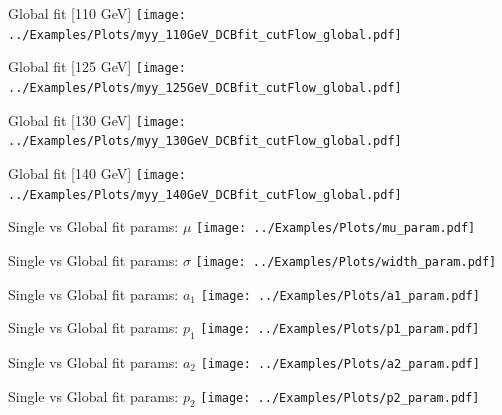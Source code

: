\documentclass[10pt,UKenglish, leqno, xcolor = dvipsnames]{beamer}
\begin{document}
		\begin{frame}{Global fit [110 GeV]}
			\vfill
			\texttt{[image: ../Examples/Plots/myy\_110GeV\_DCBfit\_cutFlow\_global.pdf]}
			\vfill
		\end{frame}
	
		\begin{frame}{Global fit [125 GeV]}
			\vfill
			\texttt{[image: ../Examples/Plots/myy\_125GeV\_DCBfit\_cutFlow\_global.pdf]}
			\vfill
		\end{frame}
	
		\begin{frame}{Global fit [130 GeV]}
			\vfill
			\texttt{[image: ../Examples/Plots/myy\_130GeV\_DCBfit\_cutFlow\_global.pdf]}
			\vfill
		\end{frame}
	
		\begin{frame}{Global fit [140 GeV]}
			\vfill
			\texttt{[image: ../Examples/Plots/myy\_140GeV\_DCBfit\_cutFlow\_global.pdf]}
			\vfill
		\end{frame}
		
		\begin{frame}{Single vs Global fit params: $\mu$}
			\vfill
			\texttt{[image: ../Examples/Plots/mu\_param.pdf]}
			\vfill
		\end{frame}

		\begin{frame}{Single vs Global fit params: $\sigma$}
			\vfill
			\texttt{[image: ../Examples/Plots/width\_param.pdf]}
			\vfill
		\end{frame}
		
		\begin{frame}{Single vs Global fit params: $a_1$}
			\vfill
			\texttt{[image: ../Examples/Plots/a1\_param.pdf]}
			\vfill
		\end{frame}
	
		\begin{frame}{Single vs Global fit params: $p_1$}
			\vfill
			\texttt{[image: ../Examples/Plots/p1\_param.pdf]}
			\vfill
		\end{frame}
	
		\begin{frame}{Single vs Global fit params: $a_2$}
			\vfill
			\texttt{[image: ../Examples/Plots/a2\_param.pdf]}
			\vfill
		\end{frame}
	
		\begin{frame}{Single vs Global fit params: $p_2$}
			\vfill
			\texttt{[image: ../Examples/Plots/p2\_param.pdf]}
			\vfill
		\end{frame}
	
\end{document}
